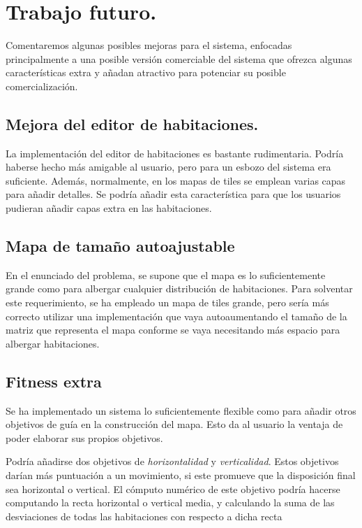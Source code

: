 \chapter{Trabajo futuro.}\label{cap:capitulo8}

Comentaremos algunas posibles mejoras para el sistema, enfocadas principalmente a una posible versión comerciable del sistema que ofrezca algunas características extra y añadan atractivo para potenciar su posible comercialización.




\section{Mejora del editor de habitaciones.}

La implementación del editor de habitaciones es bastante rudimentaria. Podría haberse hecho más amigable al usuario, pero para un esbozo del sistema era suficiente. Además, normalmente, en los mapas de tiles se emplean varias capas para añadir detalles. Se podría añadir esta característica para que los usuarios pudieran añadir capas extra en las habitaciones.

\section{Mapa de tamaño autoajustable}

En el enunciado del problema, se supone que el mapa es lo suficientemente grande como para albergar cualquier distribución de habitaciones. Para solventar este requerimiento, se ha empleado un mapa de tiles grande, pero sería más correcto utilizar una implementación que vaya autoaumentando el tamaño de la matriz que representa el mapa conforme se vaya necesitando más espacio para albergar habitaciones.

\section{Fitness extra}

Se ha implementado un sistema lo suficientemente flexible como para añadir otros objetivos de guía en la construcción del mapa. Esto da al usuario la ventaja de poder elaborar sus propios objetivos.

Podría añadirse dos objetivos de \emph{horizontalidad} y \emph{verticalidad}. Estos objetivos darían más puntuación a un movimiento, si este promueve que la disposición final sea horizontal o vertical. El cómputo numérico de este objetivo podría hacerse computando la recta horizontal o vertical media, y calculando la suma de las desviaciones de todas las habitaciones con respecto a dicha recta

